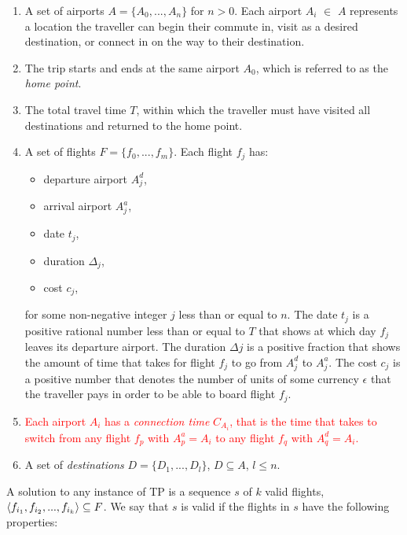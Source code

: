 \documentclass{mprop}
\theoremstyle{definition}
\begin{document}
\begin{enumerate}
\item A set of airports $A = \{ A_{0},...,A_{n} \}$ for $n > 0$. Each airport $A_{i}$ $\in$ $A$ represents a location the traveller can begin their commute in, visit as a desired destination, or connect in on the way to their destination.

\item The trip starts and ends at the same airport $A_{0}$, which is referred to as the \textit{home point}.

\item The total travel time $T$, within which the traveller must have visited all destinations and returned to the home point.
 
\item A set of flights $F = \{ f_{0},...,f_{m} \}$. Each flight $f_{j}$ has:
\begin{itemize}
\item departure airport $A^{d}_{j}$,
\item arrival airport $A^{a}_{j}$,
\item date $t_{j}$,
\item duration $\Delta_{j}$,
\item cost $c_{j}$,
\end{itemize} 
for some non-negative integer $j$ less than or equal to $n$.
The date $t_{j}$ is a positive rational number less than or equal to $T$ that shows at which day $f_{j}$ leaves its departure airport. The duration $\Delta{j}$ is a positive fraction that shows the amount of time that takes for flight $f_{j}$ to go from $A^{d}_{j}$ to $A^{a}_{j}$. The cost $c_{j}$ is a positive number that denotes the number of units of some currency $\epsilon$ that the traveller pays in order to be able to board flight $f_{j}$.

\item \textcolor{red}{Each airport $A_{i}$ has a \textit{connection time} $C_{A_{i}}$, that is the time that takes to switch from any flight $f_{p}$ with $A^{a}_{p} = A_{i}$ to any flight $f_{q}$ with $A^{d}_{q} = A_{i}$.}

\item A set of \textit{destinations} $D = \{ D_{1},...,D_{l} \}$, $D \subseteq A$, $l \leq n$.
\end{enumerate}

A solution to any instance of TP is a sequence $s$ of $k$ valid flights, $ \langle f_{i_{1}}, f_{i_{2}},...,f_{i_{k}} \rangle \\ \subseteq F$. We say that $s$ is valid if the flights in $s$ have the following properties:
\end{document}

